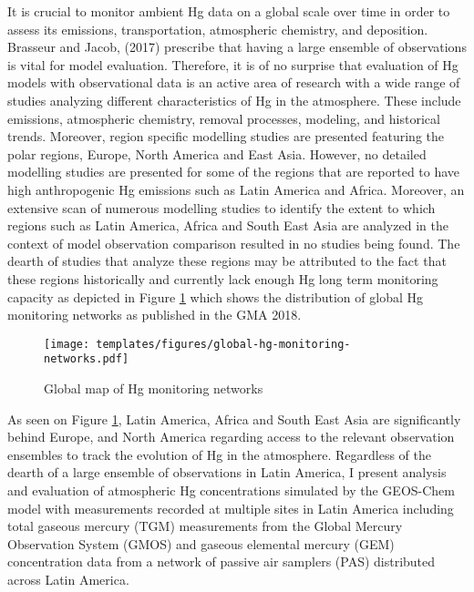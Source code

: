 \begin{flushleft}
 
It is crucial to monitor ambient Hg data on a global scale over time in order to assess its emissions, transportation, atmospheric chemistry, and deposition. Brasseur and Jacob, (2017) prescribe that having a large ensemble of observations is vital for model evaluation. Therefore, it is of no surprise that evaluation of Hg models with observational data is an active area of research with a wide range of studies analyzing different characteristics of Hg in the atmosphere. These include emissions, atmospheric chemistry, removal processes, modeling, and historical trends. Moreover, region specific modelling studies are presented featuring the polar regions, Europe, North America and East Asia. However, no detailed modelling studies are presented for some of the regions that are reported to have high anthropogenic Hg emissions such as Latin America and Africa. Moreover, an extensive scan of numerous modelling studies to identify the extent to which regions such as Latin America, Africa and South East Asia are analyzed in the context of model observation comparison resulted in no studies being found. The dearth of studies that analyze these regions may be attributed to the fact that these regions historically and currently lack enough Hg long term monitoring capacity as depicted in Figure \ref{fig:global-hg-monitoring-networks} which shows the distribution of global Hg monitoring networks as published in the GMA 2018. 
\end{flushleft}

\begin{figure}[H]
  \texttt{[image: templates/figures/global-hg-monitoring-networks.pdf]}
  \caption{Global map of Hg monitoring networks \cite{united_nations_environment_programme_technical_2019}}
  \label{fig:global-hg-monitoring-networks}
  \centering
  
\end{figure}
\FloatBarrier

\begin{flushleft}
 As seen on Figure \ref{fig:global-hg-monitoring-networks}, Latin America, Africa and South East Asia are significantly behind Europe, and North America regarding access to the relevant observation ensembles to track the evolution of Hg in the atmosphere. Regardless of the dearth of a large ensemble  of observations in Latin America, I present analysis and evaluation of atmospheric Hg concentrations simulated by the GEOS-Chem model with measurements recorded at multiple sites in Latin America including total gaseous mercury (TGM) measurements from the Global Mercury Observation System (GMOS) and gaseous elemental mercury (GEM) concentration data from a network of passive air samplers (PAS) distributed across Latin America.
\end{flushleft}




